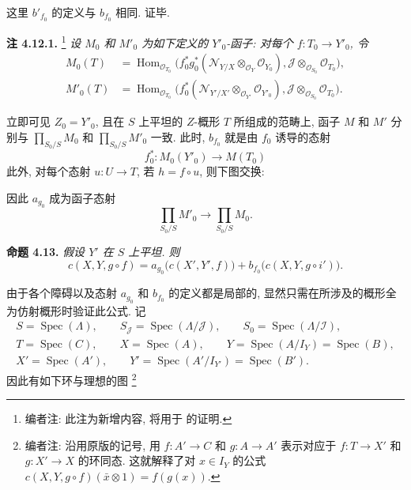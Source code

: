 这里 \(b'_{f_0}\) 的定义与 \(b_{f_0}\) 相同.
\hfill\textsc{证毕.}

\medskip
\noindent{}\textbf{注 4.12.1.}
\footnote{编者注: 此注为新增内容, 将用于 的证明.}
\textit{设 \(M_0\) 和 \(M'_0\) 为如下定义的 \(Y'_0\)-函子:
对每个 \(f:T_0\to Y'_0\), 令}
\begin{align*}
 M_0(T)&=
 \operatorname{Hom}_{\mathscr O_{T_0}}
 \bigl(f_0^*g_0^*(\mathscr N_{Y/X}
  \otimes_{\mathscr O_Y}\mathscr O_{Y_0}),
  \mathscr J\otimes_{\mathscr O_{S_0}}\mathscr O_{T_0}\bigr),\\
 M'_0(T)&=
 \operatorname{Hom}_{\mathscr O_{T_0}}
 \bigl(f_0^*(\mathscr N_{Y'/X'}
  \otimes_{\mathscr O_{Y'}}\mathscr O_{Y'_0}),
 \mathscr J\otimes_{\mathscr O_{S_0}}\mathscr O_{T_0}\bigr).
\end{align*}

立即可见 \(Z_0=Y'_0\), 且在 \(S\) 上平坦的
\(Z\)-概形 \(T\) 所组成的范畴上, 函子 \(M\) 和 \(M'\)
分别与 \(\prod_{S_0/S}M_0\) 和 \(\prod_{S_0/S}M'_0\) 一致.
此时, \(b_{f_0}\) 就是由 \(f_0\) 诱导的态射
\[
 f_0^*:M_0(Y'_0)\longrightarrow M(T_0)
\]
此外, 对每个态射 \(u:U\to T\),
若 \(h=f\circ u\), 则下图交换:

\begin{center}
\end{center}

因此 \(a_{g_0}\) 成为函子态射
\[
 \prod_{S_0/S}M'_0\longrightarrow\prod_{S_0/S}M_0.
\]

\medskip
\noindent{}\textbf{命题 4.13.}
\textit{假设 \(Y'\) 在 \(S\) 上平坦. 则}
\[
 c(X,Y,g\circ f)=a_{g_0}\bigl(c(X',Y',f)\bigr)
   +b_{f_0}\bigl(c(X,Y,g\circ i')\bigr).
\]

由于各个障碍以及态射 \(a_{g_0}\) 和 \(b_{f_0}\) 的定义都是局部的,
显然只需在所涉及的概形全为仿射概形时验证此公式. 记
\[
 \begin{gathered}
 S=\operatorname{Spec}(\Lambda),\qquad
 S_{\mathscr J}=\operatorname{Spec}(\Lambda/\mathscr J),\qquad
 S_0=\operatorname{Spec}(\Lambda/\mathscr I),\\
 T=\operatorname{Spec}(C),\qquad X=\operatorname{Spec}(A),\qquad
 Y=\operatorname{Spec}(A/I_Y)=\operatorname{Spec}(B),\\
 X'=\operatorname{Spec}(A'),\qquad
 Y'=\operatorname{Spec}(A'/I_{Y'})=\operatorname{Spec}(B').
 \end{gathered}
\]
因此有如下环与理想的图
\footnote{编者注: 沿用原版的记号, 用 \(f:A'\to C\) 和 \(g:A\to A'\)
表示对应于 \(f:T\to X'\) 和 \(g:X'\to X\) 的环同态.
这就解释了对 \(x\in I_Y\) 的公式
\(c(X,Y,g\circ f)(\bar x\otimes1)=f(g(x))\).}

